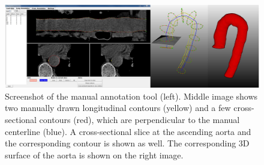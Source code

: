 %



\begin{figure}
\centering
\includegraphics[width=\textwidth]{Figures/Figure1.JPG}
\caption{Screenshot of the manual annotation tool (left). Middle image shows two manually drawn longitudinal contours (yellow) and a few cross-sectional contours (red), which are perpendicular to the manual centerline (blue). A cross-sectional slice at the ascending aorta and the corresponding contour is shown as well. The corresponding 3D surface of the aorta is shown on the right image.}
\label{fig:mannual_Annotation}
\end{figure}


